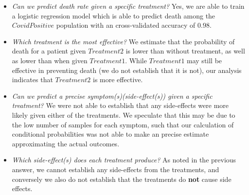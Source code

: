 \begin{itemize}
\item \textit{Can we predict death rate given a specific treatment?}
Yes, we are able to train a logistic regression model which is able to predict death among the $CovidPositive$ population with an cross-validated accuracy of $0.98$. 
\item \textit{Which treatment is the most effective?}
We estimate that the probability of death for a patient given $Treatment2$ is lower than without treatment, as well as lower than when given $Treatment1$. While $Treatment1$ may still be effective in preventing death (we do not establish that it is not), our analysis indicates that $Treatment2$ is more effective.
\item \textit{Can  we  predict  a  precise  symptom(s)(side-effect(s))  given  a  specific  treatment?}
We were not able to establish that any side-effects were more likely given either of the treatments. We speculate that this may be due to the low number of samples for each symptom, such that our calculation of conditional probabilities was not able to make an precise estimate approximating the actual outcomes.
\item \textit{Which side-effect(s) does each treatment produce?}
As noted in the previous answer, we cannot establish any side-effects from the treatments, and conversely we also do not establish that the treatments do \textbf{not} cause side effects.
\end{itemize}